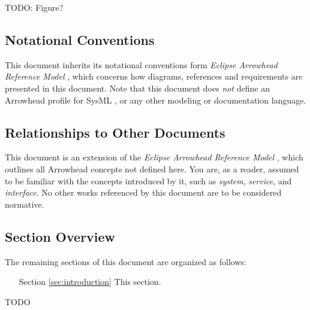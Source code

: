 TODO: Figure?

\subsection{Notational Conventions}
\label{sec:introduction:conventions}

This document inherits its notational conventions form \textit{Eclipse Arrowhead Reference Model} \cite{palm2021reference}, which concerns how diagrams, references and requirements are presented in this document.
Note that this document does \textit{not} define an Arrowhead profile for SysML \cite{omg2019sysml}, or any other modeling or documentation language.

\subsection{Relationships to Other Documents}
\label{sec:introduction:relationships}

This document is an extension of the \textit{Eclipse Arrowhead Reference Model} \cite{palm2021reference}, which outlines all Arrowhead concepts not defined here.
You are, as a reader, assumed to be familiar with the concepts introduced by it, such as \textit{system}, \textit{service}, and \textit{interface}.
No other works referenced by this document are to be considered normative. 

\subsection{Section Overview}
\label{sec:introduction:sections}

The remaining sections of this document are organized as follows:
\vspace*{2mm}
\begin{itemize}[leftmargin=2cm,rightmargin=0pt,labelwidth=2cm,labelsep=0pt,itemindent=0pt,parsep=0.1cm,topsep=0.1cm,align=left]

\item[Section \ref{sec:introduction}]
This section.

\end{itemize}

TODO